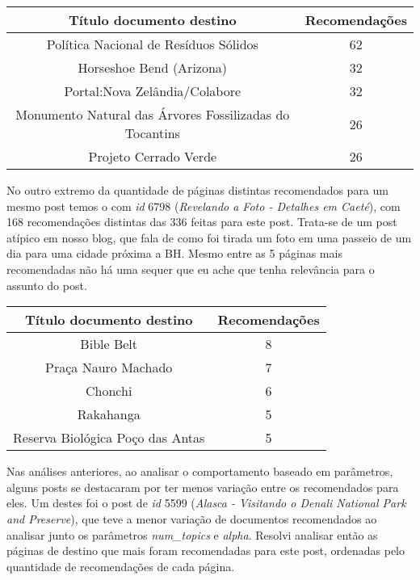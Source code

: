 \begin{center}
    \begin{tabular}{|c|c|}
        \hline
        \textbf{Título documento destino} & \textbf{Recomendações} \\
        \hline
        Política Nacional de Resíduos Sólidos & 62 \\
        \hline
        Horseshoe Bend (Arizona) & 32 \\
        \hline
        Portal:Nova Zelândia/Colabore & 32 \\
        \hline
        Monumento Natural das Árvores Fossilizadas do Tocantins & 26 \\
        \hline
        Projeto Cerrado Verde & 26 \\
        \hline
    \end{tabular}
\end{center}

No outro extremo da quantidade de páginas distintas recomendados para um mesmo post temos o com \textit{id} 6798 
(\textit{Revelando a Foto - Detalhes em Caeté}), com 168 recomendações distintas das 336 feitas para este post. Trata-se de um post atípico
em nosso blog, que fala de como foi tirada um foto em uma passeio de um dia para uma cidade próxima a BH. Mesmo entre as 5 páginas mais recomendadas 
não há uma sequer que eu ache que tenha relevância para o assunto do post.

\begin{center}
    \begin{tabular}{|c|c|}
        \hline
        \textbf{Título documento destino} & \textbf{Recomendações} \\
        \hline
        Bible Belt & 8 \\
        \hline
        Praça Nauro Machado & 7 \\
        \hline
        Chonchi & 6 \\
        \hline
        Rakahanga & 5 \\
        \hline
        Reserva Biológica Poço das Antas & 5 \\
        \hline
    \end{tabular}
\end{center}

Nas análises anteriores, ao analisar o comportamento baseado em parâmetros, alguns posts se destacaram por ter menos variação entre os 
recomendados para eles. Um destes foi o post de \textit{id} 5599 (\textit{Alasca - Visitando o Denali National Park and Preserve}), que teve a menor 
variação de documentos recomendados ao analisar junto os parâmetros \textit{num\_topics} e \textit{alpha}.
Resolvi analisar então as páginas de destino que mais foram recomendadas para este post, ordenadas pelo quantidade de recomendações de cada página.

